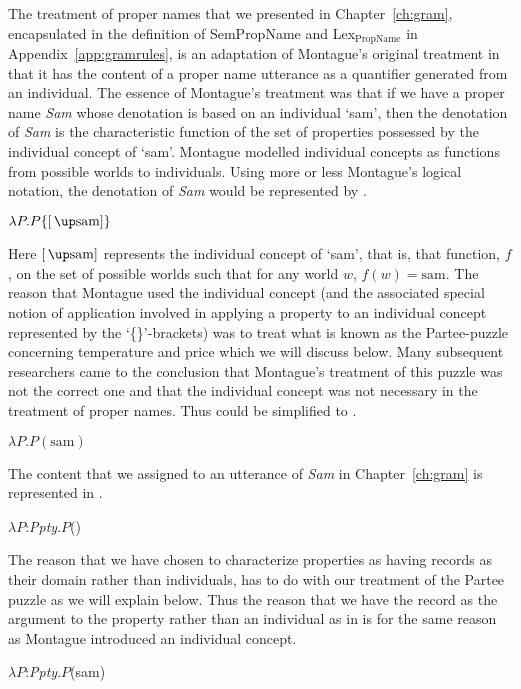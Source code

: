 The treatment of proper names that we presented in
Chapter~\ref{ch:gram}, encapsulated in the definition of SemPropName
and Lex$_{\mathrm{PropName}}$
in Appendix~\ref{app:gramrules}, is an adaptation of Montague's
original treatment in that it has the content of a proper name utterance
as a quantifier generated from an individual.  The essence of
Montague's treatment was that if we have a proper name \textit{Sam}
whose denotation is based on an individual `sam', then the denotation
of \textit{Sam} is the characteristic function of the set of
properties possessed by the individual concept of `sam'.  Montague
modelled individual concepts as functions from possible worlds to
individuals.  Using more or less Montague's logical notation, the denotation of
\textit{Sam} would be represented by \nexteg{}.
\begin{ex} 
$\lambda P.P\{[\,\up\mathrm{sam}]\}$ 
\label{ex:MontagueSam}
\end{ex} 
Here $[\,\up\mathrm{sam}]$ represents the individual concept of `sam',
that is,
that function, $f$, on the set of possible worlds such that for any
world $w$, $f(w)=\mathrm{sam}$.  The reason that Montague used the
individual concept (and the associated special notion of application
involved in applying a property to an individual concept represented
by the `\{\}'-brackets) was to treat what is known as the Partee-puzzle
concerning temperature and price which we will discuss below.  Many
subsequent researchers came to the conclusion that Montague's treatment of
this puzzle was not the correct one and that the individual concept
was not necessary in the treatment of proper names.  Thus \preveg{}
could be simplified to \nexteg{}.
\begin{ex} 
$\lambda P.P(\mathrm{sam})$ 
\end{ex} 
The content that we assigned to an utterance of \textit{Sam} in
Chapter~\ref{ch:gram} is represented in \nexteg{}.
\begin{ex} 
$\lambda P$:\textit{Ppty}.$P$() 
\end{ex} 
The reason that we have chosen to characterize properties as having
records as their domain rather than individuals, has to do with our
treatment of the Partee puzzle as we will explain below.  Thus the
reason that we have the record  as the
argument to the property rather than an individual as in \nexteg{} is for the same reason as
Montague introduced an individual concept.
\begin{ex} 
$\lambda P$:\textit{Ppty}.$P$(sam) 
\end{ex} 
